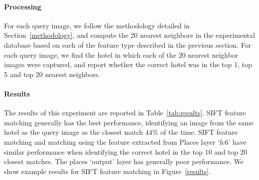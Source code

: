 \paragraph{Processing} For each query image, we follow the methodology detailed in Section~\ref{methodology}, and compute the 20 nearest neighbors in the experimental database based on each of the feature type described in the previous section.  For each query image, we find the hotel in which each of the 20 nearest neighbor images were captured, and report whether the correct hotel was in the top 1, top 5 and top 20 nearest neighbors.

\paragraph{Results} The results of this experiment are reported in Table~\ref{tab:results}. SIFT feature matching generally has the best performance, identifying an image from the same hotel as the query image as the closest match 44\% of the time. SIFT feature matching and matching using the feature extracted from Places layer `fc6' have similar performance when identifying the correct hotel in the top 10 and top 20 closest matches. The places `output' layer has generally poor performance. We show example results for SIFT feature matching in Figure~\ref{results}.


